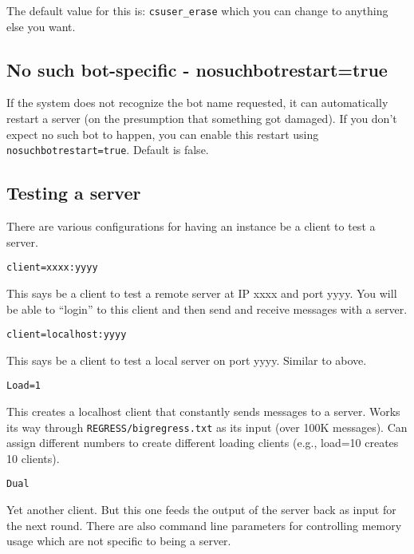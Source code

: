 \documentclass[]{article}
\begin{document}
The default value for this is: \texttt{csuser\_erase} which you can
change to anything else you want.

\subsection{No such bot-specific -
nosuchbotrestart=true}\label{no-such-bot-specific---nosuchbotrestarttrue-1}

If the system does not recognize the bot name requested, it can
automatically restart a server (on the presumption that something got
damaged). If you don't expect no such bot to happen, you can enable this
restart using \texttt{nosuchbotrestart=true}. Default is false.

\subsection{Testing a server}\label{testing-a-server}

There are various configurations for having an instance be a client to
test a server.

\begin{verbatim}
client=xxxx:yyyy
\end{verbatim}

This says be a client to test a remote server at IP xxxx and port yyyy.
You will be able to ``login'' to this client and then send and receive
messages with a server.

\begin{verbatim}
client=localhost:yyyy
\end{verbatim}

This says be a client to test a local server on port yyyy. Similar to
above.

\begin{verbatim}
Load=1
\end{verbatim}

This creates a localhost client that constantly sends messages to a
server. Works its way through \texttt{REGRESS/bigregress.txt} as its
input (over 100K messages). Can assign different numbers to create
different loading clients (e.g., load=10 creates 10 clients).

\begin{verbatim}
Dual
\end{verbatim}

Yet another client. But this one feeds the output of the server back as
input for the next round. There are also command line parameters for
controlling memory usage which are not specific to being a server.
\end{document}
